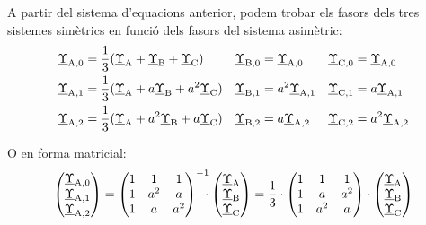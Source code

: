 A partir del sistema d'equacions anterior, podem trobar els fasors
dels tres sistemes simètrics en funció dels fasors del sistema
asimètric:
\begin{subequations}
\begin{align}
   \underline{\Upsilon}_\mathrm{A,0} &= \frac{1}{3} (\underline{\Upsilon}_\mathrm{A} + \underline{\Upsilon}_\mathrm{B} +
   \underline{\Upsilon}_\mathrm{C}) & \underline{\Upsilon}_\mathrm{B,0} &= \underline{\Upsilon}_\mathrm{A,0} &
   \underline{\Upsilon}_\mathrm{C,0} &= \underline{\Upsilon}_\mathrm{A,0}
   \label{eq:c_sim_c2}\\
   \underline{\Upsilon}_\mathrm{A,1} &= \frac{1}{3} (\underline{\Upsilon}_\mathrm{A} + a \underline{\Upsilon}_\mathrm{B} +
   a^2 \underline{\Upsilon}_\mathrm{C}) & \underline{\Upsilon}_\mathrm{B,1} &= a^2 \underline{\Upsilon}_\mathrm{A,1} &
   \underline{\Upsilon}_\mathrm{C,1} &= a \underline{\Upsilon}_\mathrm{A,1} \label{eq:c_sim_a2} \\
   \underline{\Upsilon}_\mathrm{A,2} &= \frac{1}{3} (\underline{\Upsilon}_\mathrm{A} + a^2 \underline{\Upsilon}_\mathrm{B} +
   a \underline{\Upsilon}_\mathrm{C}) & \underline{\Upsilon}_\mathrm{B,2} &= a \underline{\Upsilon}_\mathrm{A,2} &
   \underline{\Upsilon}_\mathrm{C,2} &= a^2 \underline{\Upsilon}_\mathrm{A,2} \label{eq:c_sim_b2}
\end{align}
\end{subequations}

O en forma matricial:
\begin{equation}\label{eq:c_sim_mat1}
   \begin{pmatrix}
     \cmplx{\Upsilon}\ped{A,0} \\
     \cmplx{\Upsilon}\ped{A,1} \\
     \cmplx{\Upsilon}\ped{A,2}
   \end{pmatrix} =
   \begin{pmatrix}
     1 & 1 & 1 \\
     1 & a^2 & a\\
     1 & a & a^2
   \end{pmatrix}^{-1} \hspace{-2mm}\cdot
   \begin{pmatrix}
     \cmplx{\Upsilon}\ped{A} \\
     \cmplx{\Upsilon}\ped{B} \\
     \cmplx{\Upsilon}\ped{C}
   \end{pmatrix} =  \frac{1}{3} \cdot
   \begin{pmatrix}
     1 & 1 & 1 \\
     1 & a & a^2 \\
     1 & a^2 & a
   \end{pmatrix} \cdot
   \begin{pmatrix}
     \cmplx{\Upsilon}\ped{A} \\
     \cmplx{\Upsilon}\ped{B} \\
     \cmplx{\Upsilon}\ped{C}
   \end{pmatrix}
\end{equation}

